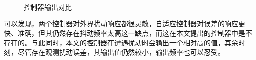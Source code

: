 \begin{figure}[H]
    \centering
    \hspace{0.5pt}
    \centering
    \caption[]{控制器输出对比}
    \label{fig:simu_pulse_sine_u}
\end{figure}

可以发现，两个控制器对外界扰动响应都很灵敏，自适应控制器对误差的响应更快、准确，但其仍然存在抖动频率太高这一缺点，而这在本文提出的控制器中是不存在的。与此同时，本文的控制器在遭遇扰动时会输出一个相对高的值，其余时刻，尽管存在观测扰动误差，其输出值仍然较小，输出频率也可以忍受。

